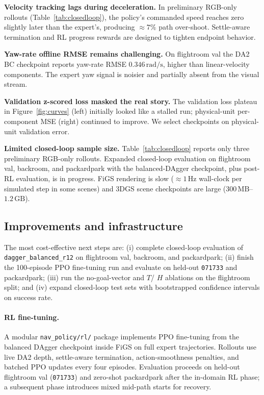 \documentclass[10pt,twocolumn,letterpaper]{article}
\begin{document}
\textbf{Velocity tracking lags during deceleration.} In preliminary RGB-only rollouts (Table~\ref{tab:closedloop}), the policy's commanded speed reaches zero slightly later than the expert's, producing $\approx 7\%$ path over-shoot. Settle-aware termination and RL progress rewards are designed to tighten endpoint behavior.

\textbf{Yaw-rate offline RMSE remains challenging.} On flightroom val the DA2 BC checkpoint reports yaw-rate RMSE $0.346\,\mathrm{rad/s}$, higher than linear-velocity components. The expert yaw signal is noisier and partially absent from the visual stream.

\textbf{Validation z-scored loss masked the real story.} The validation loss plateau in Figure~\ref{fig:curves} (left) initially looked like a stalled run; physical-unit per-component MSE (right) continued to improve. We select checkpoints on physical-unit validation error.

\textbf{Limited closed-loop sample size.} Table~\ref{tab:closedloop} reports only three preliminary RGB-only rollouts. Expanded closed-loop evaluation on flightroom val, backroom, and packardpark with the balanced-DAgger checkpoint, plus post-RL evaluation, is in progress. FiGS rendering is slow ($\approx 1\,\mathrm{Hz}$ wall-clock per simulated step in some scenes) and 3DGS scene checkpoints are large ($300\,\mathrm{MB}$--$1.2\,\mathrm{GB}$).

\subsection{Improvements and infrastructure}

The most cost-effective next steps are: (i) complete closed-loop evaluation of \texttt{dagger\_balanced\_r12} on flightroom val, backroom, and packardpark; (ii) finish the 100-episode PPO fine-tuning run and evaluate on held-out \texttt{071733} and packardpark; (iii) run the no-goal-vector and $T$/ $H$ ablations on the flightroom split; and (iv) expand closed-loop test sets with bootstrapped confidence intervals on success rate.

\paragraph{RL fine-tuning.}  A modular \texttt{nav\_policy/rl/} package implements PPO fine-tuning from the balanced DAgger checkpoint inside FiGS on full expert trajectories. Rollouts use live DA2 depth, settle-aware termination, action-smoothness penalties, and batched PPO updates every four episodes. Evaluation proceeds on held-out flightroom val (\texttt{071733}) and zero-shot packardpark after the in-domain RL phase; a subsequent phase introduces mixed mid-path starts for recovery.
\end{document}
